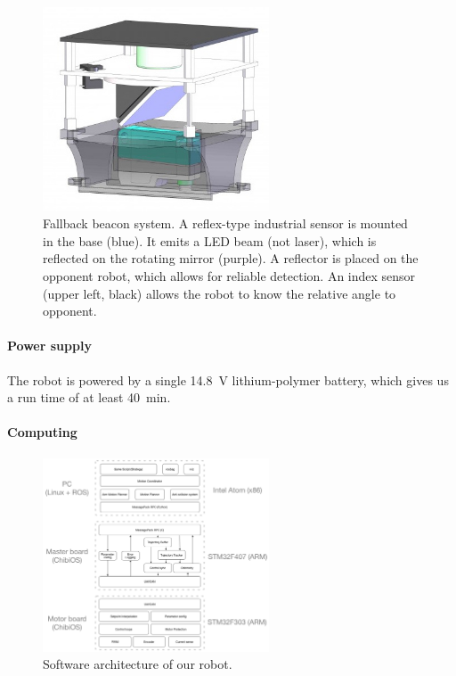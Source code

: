 \documentclass[a4paper]{paper}
\begin{document}
\begin{figure}[h]
    \begin{center}
        \includegraphics[width=0.6\textwidth]{images/Balise}
        \caption{Fallback beacon system.
            A reflex-type industrial sensor is mounted in the base (blue).
            It emits a LED beam (not laser), which is reflected on the rotating mirror (purple).
            A reflector is placed on the opponent robot, which allows for reliable detection.
            An index sensor (upper left, black) allows the robot to know the relative angle to opponent.
        }
        \label{fig:balise}
    \end{center}
\end{figure}

\paragraph{Power supply}
The robot is powered by a single \SI{14.8}{\volt} lithium-polymer battery, which gives us a run time of at least \SI{40}{\minute}.

\paragraph{Computing}
\begin{figure}[h]
    \begin{center}
        \includegraphics[width=0.6\textwidth]{images/software}
        \caption{Software architecture of our robot.}
        \label{fig:balise}
    \end{center}
\end{figure}
\end{document}
